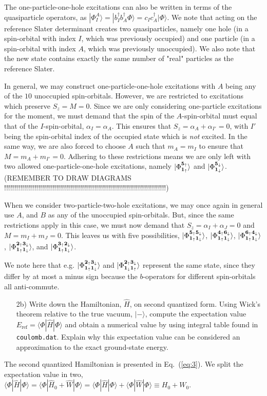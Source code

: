 \documentclass[a4paper]{article}
\newcommand{\eq} [1]{Eq.\ (\ref{eq:#1})}
\renewcommand{\u}[1]{{\bf #1}_\uparrow}
\renewcommand{\d}[1]{{\bf #1}_\downarrow}
\begin{document}
The one-particle-one-hole excitations can also be written in terms of the quasiparticle operators, as $|\Phi^A_I\rangle=|b_I^\dagger b_A^\dagger\Phi\rangle = c_I c_A^\dagger |\Phi\rangle$. We note that acting on the reference Slater determinant creates two quasiparticles, namely one hole (in a spin-orbital with index $I$, which was previously occupied) and one particle (in a spin-orbital with index $A$, which was previously unoccupied). We also note that the new state contains exactly the same number of "real" particles as the reference Slater.

In general, we may construct one-particle-one-hole excitations with $A$ being any of the $10$ unoccupied spin-orbitals. However, we are restricted to excitations which preserve $S_z=M=0$. Since we are only considering one-particle excitations for the moment, we must demand that the spin of the $A$-spin-orbital must equal that of the $I$-spin-orbital, $\alpha_I=\alpha_A$. This ensures that $S_z=\alpha_A+\alpha_{I'}=0$, with $I'$ being the spin-orbital index of the occupied state which is \emph{not} excited. In the same way, we are also forced to choose $A$ such that $m_A=m_I$ to ensure that $M=m_A+m_{I'}=0$. Adhering to these restrictions means we are only left with two allowed one-particle-one-hole excitations, namely $|\Phi^{\u{5}}_{\u{1}}\rangle$ and $|\Phi^{\d{5}}_{\d{1}}\rangle$. (REMEMBER TO DRAW DIAGRAMS !!!!!!!!!!!!!!!!!!!!!!!!!!!!!!!!!!!!!!!!!!!!!!!!!!!!!!!!!!!!!!!!!!!!!!!!!!!!!!!!!)

When we consider two-particle-two-hole excitations, we may once again in general use $A$, and $B$ as any of the unoccupied spin-orbitals. But, since the same restrictions apply in this case, we must now demand that $S_z=\alpha_I + \alpha_J=0$ and $M=m_I+m_J=0$. This leaves us with five possibilities,
$|\Phi^{\u{5}\d{5}}_{\u{1}\d{1}}\rangle$, $|\Phi^{\u{4}\d{6}}_{\u{1}\d{1}}\rangle$, $|\Phi^{\u{6}\d{4}}_{\u{1}\d{1}}\rangle$, $|\Phi^{\u{2}\d{3}}_{\u{1}\d{1}}\rangle$, and $|\Phi^{\u{3}\d{2}}_{\u{1}\d{1}}\rangle$. 

We note here that e.g. $|\Phi^{\u{2}\d{3}}_{\u{1}\d{1}}\rangle$ and $|\Phi^{\u{2}\d{3}}_{\d{1}\u{1}}\rangle$ represent the same state, since they differ by at most a minus sign because the $b$-operators for different spin-orbitals all anti-commute.

\begin{exframe}
\begin{itemize}
  \item[2b)] Write down the Hamiltonian, $\hat{H}$, on second quantized form. Using Wick's theorem relative to the true vacuum, $|-\rangle$, compute the expectation value $E_\text{ref}=\langle \Phi |\hat{H} | \Phi\rangle$ and obtain a numerical value by using integral table found in \texttt{coulomb.dat}. Explain why this expectation value can be considered an approximation to the exact ground-state energy. 
\end{itemize}
\end{exframe}
The second quantized Hamiltonian is presented in \eq{3}. We split the expectation value in two, $\langle \Phi |\hat{H} | \Phi\rangle=\langle \Phi |\hat{H}_0 +\hat{W} | \Phi\rangle = \langle \Phi |\hat{H} | \Phi\rangle + \langle \Phi |\hat{W} | \Phi\rangle \equiv H_0+W_0$. 
\end{document}
